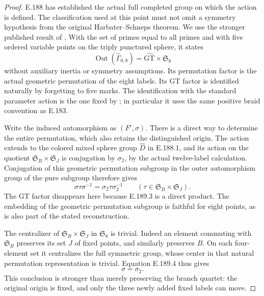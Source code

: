 \begin{proof}
E.188 has established the actual full completed group
on which the action is defined.  The classification used
at this point must not omit a symmetry hypothesis from
the original Harbater--Schneps theorem.
We use the stronger published result of
\citet[Corollary C, p.4; Definition 2.7 and
Corollary 2.8 with proof, pp.31--32 in the
author version]{LitHoshiMinamideMochizuki2022}.
With the set of primes equal to all primes and with five
ordered variable points on the triply punctured sphere,
it states
\[
       \operatorname{Out}(\widehat\Gamma_{0,8})
                    =\widehat{\mathrm{GT}}\times\mathfrak S_8
\tag{E.189.3}
\]
without auxiliary inertia or symmetry assumptions.
Its permutation factor is the actual geometric
permutation of the eight labels.
Its GT factor is identified naturally by forgetting to
five marks.  The identification with the standard
parameter action is the one fixed by
\citet[Main Theorem; \S3.1, Lemma 1 and Theorem 5,
author pp.30--31]{SymHarbaterSchneps2000};
in particular it uses the same positive braid convention
as E.183.

Write the induced automorphism as \((F',\sigma)\).
There is a direct way to determine the entire permutation,
which also retains the distinguished origin.
The action extends to the colored mixed sphere group
\(\widehat D\) in E.188.1, and its action on the quotient
\(\mathfrak S_B\times\mathfrak S_J\) is conjugation by
\(\sigma_2\), by the actual twelve-label calculation.
Conjugation of this geometric permutation subgroup in
the outer automorphism group of the pure subgroup
therefore gives
\[
 \sigma\tau\sigma^{-1}
       =\sigma_2\tau\sigma_2^{-1}
           \qquad(\tau\in\mathfrak S_B\times\mathfrak S_J).
\tag{E.189.4}
\]
The GT factor disappears here because E.189.3 is a
direct product.  The embedding of the geometric
permutation subgroup is faithful for eight points,
as is also part of the stated reconstruction.

The centralizer of
\(\mathfrak S_B\times\mathfrak S_J\) in \(\mathfrak S_8\)
is trivial.  Indeed an element commuting with
\(\mathfrak S_B\) preserves its set \(J\) of fixed
points, and similarly preserves \(B\).  On each
four-element set it centralizes the full symmetric
group, whose center in that natural permutation
representation is trivial.  Equation E.189.4 thus gives
\[
                               \sigma=\sigma_2.
\tag{E.189.5}
\]
This conclusion is stronger than merely preserving
the branch quartet: the original origin is fixed,
and only the three newly added fixed labels can move.


\end{proof}
